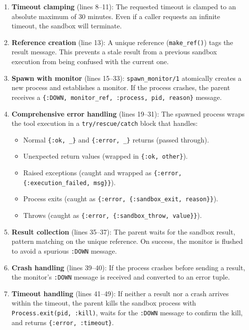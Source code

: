 \documentclass[12pt,a4paper]{article}
\theoremstyle{plain}
\theoremstyle{definition}
\begin{document}
\begin{enumerate}[leftmargin=2em]
\item \textbf{Timeout clamping} (lines 8--11): The requested timeout is clamped to an absolute maximum of 30 minutes. Even if a caller requests an infinite timeout, the sandbox will terminate.

\item \textbf{Reference creation} (line 13): A unique reference (\texttt{make\_ref()}) tags the result message. This prevents a stale result from a previous sandbox execution from being confused with the current one.

\item \textbf{Spawn with monitor} (lines 15--33): \texttt{spawn\_monitor/1} atomically creates a new process and establishes a monitor. If the process crashes, the parent receives a \texttt{\{:DOWN, monitor\_ref, :process, pid, reason\}} message.

\item \textbf{Comprehensive error handling} (lines 19--31): The spawned process wraps the tool execution in a \texttt{try/rescue/catch} block that handles:
  \begin{itemize}
  \item Normal \texttt{\{:ok, \_\}} and \texttt{\{:error, \_\}} returns (passed through).
  \item Unexpected return values (wrapped in \texttt{\{:ok, other\}}).
  \item Raised exceptions (caught and wrapped as \texttt{\{:error, \{:execution\_failed, msg\}\}}).
  \item Process exits (caught as \texttt{\{:error, \{:sandbox\_exit, reason\}\}}).
  \item Throws (caught as \texttt{\{:error, \{:sandbox\_throw, value\}\}}).
  \end{itemize}

\item \textbf{Result collection} (lines 35--37): The parent waits for the sandbox result, pattern matching on the unique reference. On success, the monitor is flushed to avoid a spurious \texttt{:DOWN} message.

\item \textbf{Crash handling} (lines 39--40): If the process crashes before sending a result, the monitor's \texttt{:DOWN} message is received and converted to an error tuple.

\item \textbf{Timeout handling} (lines 41--49): If neither a result nor a crash arrives within the timeout, the parent kills the sandbox process with \texttt{Process.exit(pid, :kill)}, waits for the \texttt{:DOWN} message to confirm the kill, and returns \texttt{\{:error, :timeout\}}.
\end{enumerate}
\end{document}
